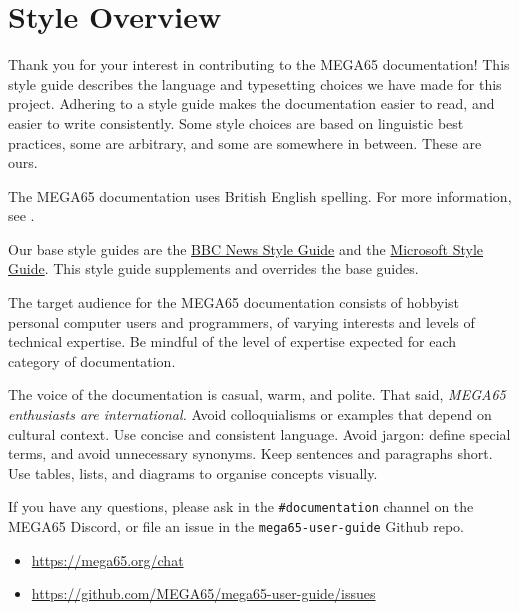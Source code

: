 



\chapter{Style Overview}

Thank you for your interest in contributing to the MEGA65 documentation! This style guide describes the language and typesetting choices we have made for this project. Adhering to a style guide makes the documentation easier to read, and easier to write consistently. Some style choices are based on linguistic best practices, some are arbitrary, and some are somewhere in between. These are ours.

The MEGA65 documentation uses British English spelling. For more information, see .

Our base style guides are the \href{https://www.bbc.co.uk/newsstyleguide/}{BBC News Style Guide} and the \href{https://docs.microsoft.com/en-us/style-guide/welcome/}{Microsoft Style Guide}. This style guide supplements and overrides the base guides.

The target audience for the MEGA65 documentation consists of hobbyist personal computer users and programmers, of varying interests and levels of technical expertise. Be mindful of the level of expertise expected for each category of documentation.

The voice of the documentation is casual, warm, and polite. That said, \emph{MEGA65 enthusiasts are international.} Avoid colloquialisms or examples that depend on cultural context. Use concise and consistent language. Avoid jargon: define special terms, and avoid unnecessary synonyms. Keep sentences and paragraphs short. Use tables, lists, and diagrams to organise concepts visually.

If you have any questions, please ask in the {\tt \#documentation} channel on the MEGA65 Discord, or file an issue in the {\tt mega65-user-guide} Github repo.

\begin{itemize}
\item \url{https://mega65.org/chat}
\item \url{https://github.com/MEGA65/mega65-user-guide/issues}
\end{itemize}


